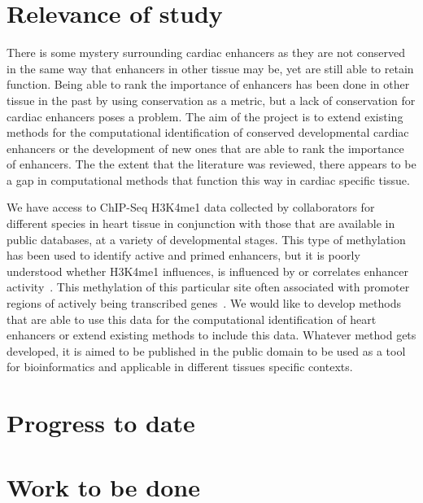 \documentclass[12pt,a4paper]{article}
\begin{document}
    \section{Relevance of study}
        There is some mystery surrounding cardiac enhancers as they are not conserved in the same way that enhancers in other tissue may be, yet are still able to retain function. Being able to rank the importance of enhancers has been done in other tissue in the past by using conservation as a metric, but a lack of conservation for cardiac enhancers poses a problem.
        The aim of the project is to extend existing methods for the computational identification of conserved developmental cardiac enhancers or the development of new ones that are able to rank the importance of enhancers. The the extent that the literature was reviewed, there appears to be a gap in computational methods that function this way in cardiac specific tissue.
        
        We have access to ChIP-Seq H3K4me1 data collected by collaborators for different species in heart tissue in conjunction with those that are available in public databases, at a variety of developmental stages. This type of methylation has been used to identify active and primed enhancers, but it is poorly understood whether H3K4me1 influences, is influenced by or correlates enhancer activity~\cite{rada2018h3k4me1}. This methylation of this particular site often associated with promoter regions of actively being transcribed genes~\cite{barski2007high}. We would like to develop methods that are able to use this data for the computational identification of heart enhancers or extend existing methods to include this data. Whatever method gets developed, it is aimed to be published in the public domain to be used as a tool for bioinformatics and applicable in different tissues specific contexts.  
        
    \section{Progress to date}
    
    
    \section{Work to be done}
    
\end{document}
